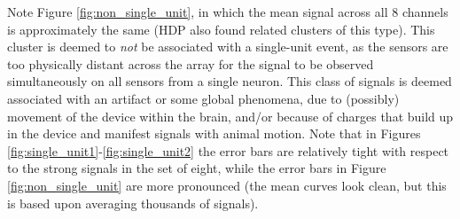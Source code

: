 \documentclass[journal]{IEEEtran}
\begin{document}
Note Figure \ref{fig:non_single_unit}, in which the mean signal across all 8 channels is approximately the same (HDP also found related clusters of this type). This cluster is deemed to \emph{not} be associated with a single-unit event, as the sensors are too physically distant across the array for the signal to be observed simultaneously on all sensors from a single neuron. This class of signals is deemed associated with an artifact or some global phenomena, due to (possibly) movement of the device within the brain, and/or because of charges that build up in the device and manifest signals with animal motion. Note that in Figures \ref{fig:single_unit1}-\ref{fig:single_unit2} the error bars are relatively tight with respect to the strong signals in the set of eight, while the error bars in Figure \ref{fig:non_single_unit} are more pronounced (the mean curves look clean, but this is based upon averaging thousands of signals).
\end{document}
